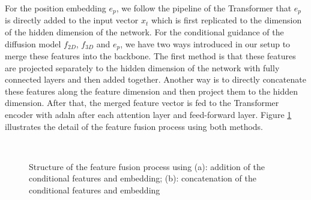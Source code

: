 \documentclass[12pt,DIV14,BCOR12mm,a4paper,footinclude=false,headinclude,parskip=half-,twoside,openright,cleardoublepage=empty,toc=index,bibliography=totoc,listof=totoc]{scrreprt}
\numberwithin{equation}{chapter}
\begin{document}
For the position embedding $e_{p}$, we follow the pipeline of the Transformer that $e_{p}$ is directly added to the input vector $x_{t}$ which is first replicated to the dimension of the hidden dimension of the network. For the conditional guidance of the diffusion model $f_{2D}$, $f_{3D}$ and $e_{p}$, we have two ways introduced in our setup to merge these features into the backbone. The first method is that these features are projected separately to the hidden dimension of the network with fully connected layers and then added together. Another way is to directly concatenate these features along the feature dimension and then project them to the hidden dimension. After that, the merged feature vector is fed to the Transformer encoder with \gls{adaln} after each attention layer and feed-forward layer. Figure \ref{img:fuse} illustrates the detail of the feature fusion process using both methods.
\begin{figure}[h]
  \centering
   \\
  \centering
  \caption{Structure of the feature fusion process using (a): addition of the conditional features and embedding; (b): concatenation of the conditional features and embedding}
  \label{img:fuse}
\end{figure}
\end{document}
